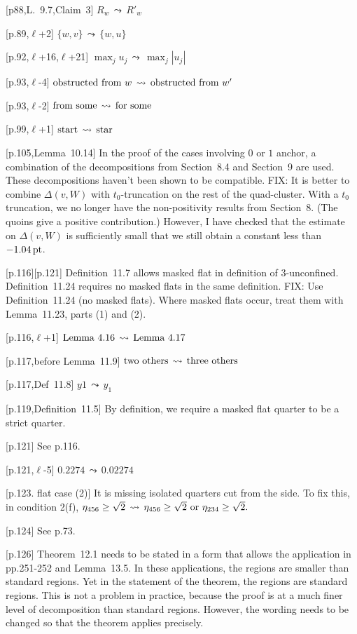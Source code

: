 \documentclass[11pt]{amsart}
\def\op#1{{\text{#1}}}
\def\lto{\ensuremath{\,\leadsto\,}}
\def\line{$\ell$}
\def\text{\hbox}
\begin{document}
[p88,L.~9.7,Claim~3]
        $R_w \lto R'_w$

[p.89,\line+2]
	$
	\{w,v\}\lto\{w,u\}
	$

[p.92,\line+16,\line+21]
   $     \max_j u_j \lto \max_j |u_j|$
	
[p.93,\line-4]
	$
	\text{obstructed from }w \lto
	\text{obstructed from }w'
	$
		
[p.93,\line-2]
	$
	\text{from some} \lto \text{for some}
	$

[p.99,\line+1]
        $
        \text{start} \lto \text{star}
        $

[p.105,Lemma~10.14]  In the proof of the cases involving
   $0$ or $1$ anchor, a combination of the decompositions from
   Section~8.4 and Section~9 are used.  These decompositions haven't
   been shown to be compatible.  
   FIX: It is better to combine
   $\Delta(v,W)$ with $t_0$-truncation on the rest of the quad-cluster.
   With a $t_0$ truncation, we no longer have the non-positivity results
   from Section~8.  (The quoins give a positive contribution.) However,
   I have checked that
   the estimate on $\Delta(v,W)$ is sufficiently small that we still
   obtain a constant less than $-1.04\,\op{pt}$.
   

[p.116][p.121] Definition~11.7 allows masked
flat in definition of $3$-unconfined.
Definition~11.24 requires no masked flats
in the same definition.  FIX: Use Definition~11.24 (no masked flats).  Where masked flats occur,
treat them with Lemma~11.23, parts (1) and (2).

[p.116,\line+1] 
	$
	\text{Lemma}~4.16 \lto \text{Lemma}~4.17
	$

[p.117,before Lemma~11.9]
	$
	\text{two others} \lto \text{three others}
	$
	
[p.117,Def~11.8]
    $
    y1 \lto y_1
    $
    
 
[p.119,Definition~11.5]  By definition, we require a masked flat quarter to
be a strict quarter. 
	
[p.121] See p.116.

[p.121,\line-5]
	$
	0.2274 \lto 0.02274
	$
	
[p.123. flat case (2)]  It is missing
isolated quarters cut from the side.
To fix this, in condition 2(f), 
	$
	\eta_{456}\ge\sqrt2 \lto
	\eta_{456}\ge\sqrt2 \text{ or } \eta_{234}\ge\sqrt2.
	$
	
[p.124] See p.73.
	
[p.126]  Theorem~12.1 needs to be stated in
a form that allows the application in pp.251-252
and Lemma~13.5.  In these applications, the
regions are smaller than standard regions.
Yet in the statement of the theorem, the regions
are standard regions.  This is not a problem
in practice, because the proof is at a much
finer level of decomposition than standard regions.
However, the wording needs to be changed so
that the theorem applies precisely.
\end{document}
